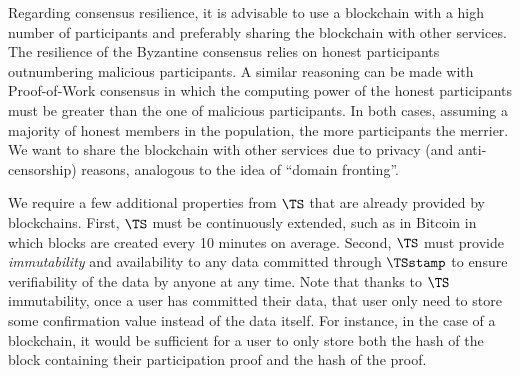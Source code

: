 Regarding consensus resilience, it is advisable to use a blockchain with a high 
number of participants and preferably sharing the blockchain with other 
services.
The resilience of the Byzantine consensus relies on honest participants outnumbering malicious participants.
A similar reasoning can be made with Proof-of-Work consensus in which the computing power of the honest participants must be greater than the one of malicious participants.
In both cases, assuming a majority of honest members in the population, the more participants the merrier.
We want to share the blockchain with other services due to privacy (and 
anti-censorship) reasons, analogous to the idea of \enquote{domain fronting}.

We require a few additional properties from \(\TS\) that are already provided by blockchains.
First, \(\TS\) must be continuously extended, such as in Bitcoin in which blocks are created every 10 minutes on average.
Second, \(\TS\) must provide \emph{immutability} and availability to any data committed through \(\TSstamp\) to ensure verifiability of the data by anyone at any time.
Note that thanks to \(\TS\) immutability, once a user has committed their data, that user only need to store some confirmation value instead of the data itself.
For instance, in the case of a blockchain, it would be sufficient for a user to only store both the hash of the block containing their participation proof and the hash of the proof. 


